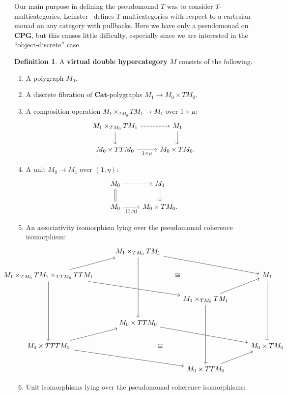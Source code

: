 \documentclass{article}
\theoremstyle{definition}
\newtheorem{defn}[thm]{Definition}
\theoremstyle{remark}
\def\Cat{\ensuremath{\mathbf{Cat}}}
\def\cpg{\ensuremath{\mathbf{CPG}}\xspace}
\begin{document}
Our main purpose in defining the pseudomonad $T$ was to consider $T$-multicategories.
Leinster~\cite{leinster:higher-opds} defines $T$-multicategories with respect to a cartesian monad on any category with pullbacks.
Here we have only a pseudomonad on \cpg, but this causes little difficulty, especially since we are interested in the ``object-discrete'' case.

\begin{defn}
  A \textbf{virtual double hypercategory} $M$ consists of the following.
  \begin{enumerate}
  \item A polygraph $M_0$.
  \item A discrete fibration of \Cat-polygraphs $M_1 \to M_0 \times TM_0$.
  \item A composition operation $M_1 \times_{TM_0} TM_1 \to M_1$ over $1\times \mu$:
    \[
    \begin{tikzcd}
      M_1 \times_{TM_0} TM_1 \ar[r,dashed] \ar[d] & M_1\ar[d]\\
      M_0 \times TTM_0 \ar[r,"1\times \mu"'] & M_0\times TM_0.
    \end{tikzcd}
    \]
  \item A unit $M_0 \to M_1$ over $(1,\eta)$:
    \[
    \begin{tikzcd}
      M_0 \ar[r,dashed] \ar[d,equals] & M_1 \ar[d] \\
      M_0\ar[r,"{(1,\eta)}"'] & M_0\times TM_0.
    \end{tikzcd}
    \]
  \item An associativity isomorphism lying over the pseudomonad coherence isomorphism:
    \[\hspace{-2cm}
    \begin{tikzcd}
      & M_1 \times_{TM_0} TM_1 \ar[drr] \ar[ddd]\\
      M_1 \times_{TM_0} TM_1 \times_{TTM_0} TTM_1 \ar[ur] \ar[drr] \ar[ddd] \ar[rrr,phantom,"\cong"] &&&
      M_1 \ar[ddd] \\
      && M_1 \times_{TM_0} TM_1  \ar[ur]\ar[ddd]\\
      & M_0\times TTM_0\ar[drr] \\
      M_0 \times TTTM_0 \ar[ur] \ar[drr] \ar[rrr,phantom,"\cong"] &&&
      M_0\times TM_0 \\
      && M_0\times TTM_0\ar[ur]
    \end{tikzcd}\hspace{-2cm}
    \]
  \item Unit isomorphisms lying over the pseudomonad coherence isomorphisms:

\end{enumerate}
\end{defn}
\end{document}
